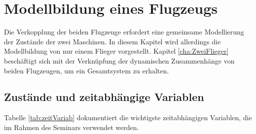 \chapter{Modellbildung eines Flugzeugs}\label{cha:Modellbildung}
Die Verkopplung der beiden Flugzeuge erfordert eine gemeinsame Modellierung der Zustände der zwei Maschinen. In diesem Kapitel wird allerdings die Modellbildung von nur einem Flieger vorgestellt. Kapitel \ref{cha:ZweiFlieger} beschäftigt sich mit der Verknüpfung der dynamischen Zusammenhänge von beiden Flugzeugen, um ein Gesamtsystem zu erhalten.
\section{Zustände und zeitabhängige Variablen}
Tabelle \ref{tab:zeitVariab} dokumentiert die wichtigste zeitabhängigen Variablen, die im Rahmen des Seminars verwendet werden.
